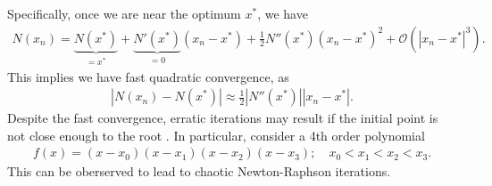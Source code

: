 \begin{ex}
Specifically, once we are near the optimum $x^{*}$, we have
\begin{align}
N(x_n) = \underbrace{N(x^{*})}_{=x^{*}} + \underbrace{N'(x^{*})}_{=0}(x_n - x^{*}) + \frac{1}{2} N''(x^{*})(x_n - x^{*})^{2} + \mathcal{O}\left( | x_n - x^{*}|^{3}\right).
\end{align}
This implies we have fast quadratic convergence, as
\begin{align}
	\left| N(x_n) - N(x^{*}) \right| \approx \frac{1}{2} | N''(x^{*})| |x_{n} - x^{*}|.
\end{align}
Despite the fast convergence, erratic iterations may result if the initial point is not close enough to the root \cite{SaariUrenko}. In particular, consider a 4th order polynomial 
\begin{align}
	f(x) = (x-x_0)(x-x_1)(x-x_2)(x-x_3);\quad x_0<x_1<x_2<x_3.
\end{align}
This can be oberserved to lead to chaotic Newton-Raphson iterations.
\end{ex}

